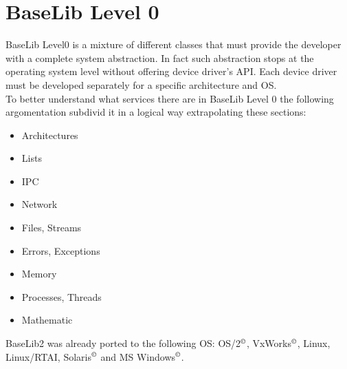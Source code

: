 \chapter{BaseLib Level 0}



BaseLib Level0 is a mixture of different classes that must provide the developer with a complete system abstraction. In fact such abstraction stops at the operating system level without offering device driver's API. Each device driver must be developed separately for a specific architecture and OS. \\

To better understand what services there are in BaseLib Level 0 the following argomentation subdivid it in a logical way extrapolating these sections:

\begin{itemize}
 \item Architectures
 \item Lists

 \item IPC

 \item Network
 \item Files, Streams

 \item Errors, Exceptions
 \item Memory
 \item Processes, Threads

 \item Mathematic
\end{itemize}

BaseLib2 was already ported to the following OS: OS/2$^{\copyright}$, VxWorks$^{\copyright}$, Linux, Linux/RTAI, Solaris$^\copyright$ and MS Windows$^\copyright$.






